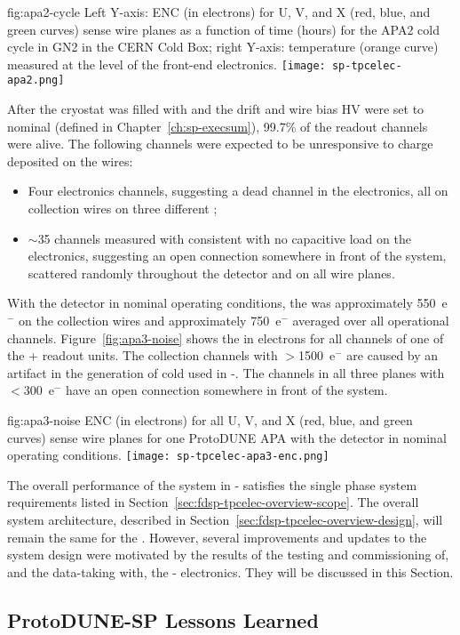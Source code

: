 \begin{dunefigure}
{fig:apa2-cycle}
{Left Y-axis: ENC (in electrons) for U, V, and X (red, blue, and green curves) sense wire planes as a function of time (hours) for the APA2 cold cycle in GN2 in the CERN Cold Box; right Y-axis: temperature (orange curve) measured at the level of the front-end electronics.}
\texttt{[image: sp-tpcelec-apa2.png]}
\end{dunefigure}

After the cryostat was filled with  and the drift and wire bias HV were set to nominal (defined in Chapter~\ref{ch:sp-execsum}), 99.7\% of the  readout channels were alive. The following channels were expected to be unresponsive to charge deposited on the wires:
\begin{itemize}
\item Four electronics channels, suggesting a dead channel in the electronics, all on collection wires on three different ;
\item $\sim$35 channels measured with  consistent with no capacitive load on the  electronics, suggesting an open connection somewhere in front of the  system, scattered randomly throughout the detector and on all wire planes.
\end{itemize}
With the detector in nominal operating conditions, the  was approximately 550~e$^-$ on the collection wires and approximately 750~e$^-$ averaged over all operational channels. Figure~\ref{fig:apa3-noise} shows the  in electrons for all channels of one of the + readout units. The collection channels with $>$1500~e$^-$ are caused by an artifact in the generation of cold   used in -. The channels in all three planes with $<$300~e$^-$ have an open connection somewhere in front of the  system.

\begin{dunefigure}
{fig:apa3-noise}
{ENC (in electrons) for all U, V, and X (red, blue, and green curves) sense wire planes for one ProtoDUNE APA with the detector in nominal operating conditions.}
\texttt{[image: sp-tpcelec-apa3-enc.png]}
\end{dunefigure}

The overall performance of the  system in - satisfies the  single phase   system requirements listed in Section~\ref{sec:fdsp-tpcelec-overview-scope}. The overall system architecture, described in Section~\ref{sec:fdsp-tpcelec-overview-design}, will remain the same for the  . However, several improvements and updates to the  system design were motivated by the results of the testing and commissioning of, and the data-taking with, the - electronics. They will be discussed in this Section.

\subsection{ProtoDUNE-SP Lessons Learned}
\label{sec:fdsp-tpcelec-overview-lessonslearned}

